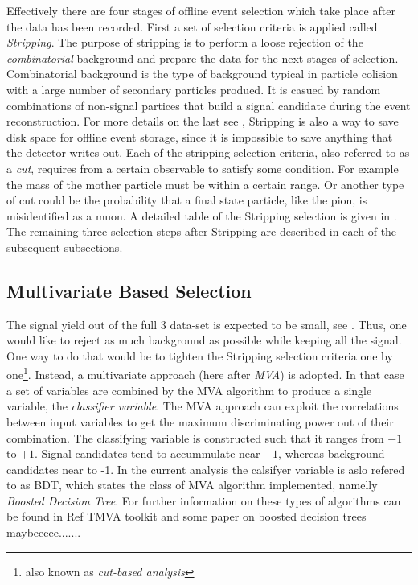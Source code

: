 
Effectively there are four stages of offline event selection which take place after the data has been recorded.
First a set of selection criteria is applied called {\it Stripping}. The purpose of stripping is to perform
a loose rejection of the {\it combinatorial} background and prepare the data for the next stages of selection.
Combinatorial background is the type of background typical in particle colision with a large number of secondary
particles produed. It is casued by random combinations of non-signal partices that build a signal candidate during
the event reconstruction. For more details on the last see ,
Stripping is also a way to save disk space for offline event storage, since it is impossible to save anything
that the detector writes out. Each of the stripping selection criteria, also referred to as a {\it cut},
requires from a certain observable to satisfy some condition. For example the mass of the mother particle \Bs must be within
a certain range. Or another type of cut could be the probability that a final state particle, like the pion, is misidentified
as a muon. A detailed table of the Stripping selection is given in . The remaining three selection
steps after Stripping are described in each of the subsequent subsections.

\subsection{Multivariate Based Selection}
\label{Multivariate_Based_Selection}

The \BsJpsiKst signal yield out of the full 3 \invfb data-set is expected to be small, see . Thus, one would like to
reject as much background as possible while keeping all the signal. One way to do that would be to tighten the Stripping selection criteria
one by one\footnote{also known as {\it cut-based analysis}}. Instead, a multivariate approach (here after {\it MVA}) is adopted.
In that case a set of variables are combined by the MVA algorithm to produce a single variable, the {\it classifier variable}.
The MVA approach can exploit the correlations between input variables to get the maximum discriminating power out of their combination.
The classifying variable is constructed such that it ranges from $-1$ to $+1$. Signal candidates tend to accummulate near $+1$,
whereas background candidates near to -1. In the current analysis the calsifyer variable is aslo refered to as BDT, which states
the class of MVA algorithm implemented, namelly {\it Boosted Decision Tree}. For further information on these types of algorithms
can be found in {\color{red}Ref TMVA toolkit and some paper on boosted decision trees maybeeeee.......}

